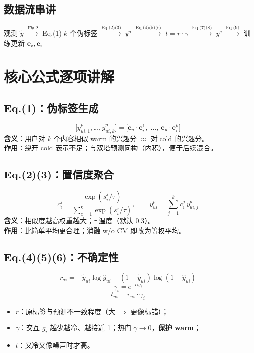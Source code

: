 \documentclass[11pt,a4paper]{ctexart}
\begin{document}
\subsection{数据流串讲}
\begin{keybox}[记忆用数据流]
观测 $\tilde{y}$
\;$\xrightarrow{\text{Fig.2}}$\;
Eq.(1) $k$ 个伪标签
\;$\xrightarrow{\text{Eq.(2)(3)}}$\;
$y^{p}$
\;$\xrightarrow{\text{Eq.(4)(5)(6)}}$\;
$t=r\cdot\gamma$
\;$\xrightarrow{\text{Eq.(7)(8)}}$\;
$y^{c}$
\;$\xrightarrow{\text{Eq.(9)}}$\;
训练更新 $\mathbf{e}_u,\mathbf{e}_i$
\end{keybox}

\section{核心公式逐项讲解}

\subsection{Eq.(1)：伪标签生成}
\[
\bigl[y^{p}_{ui,1},\ldots,y^{p}_{ui,k}\bigr]
=
\bigl[
\mathbf{e}_u\cdot\mathbf{e}_i^{1},\;\ldots,\;
\mathbf{e}_u\cdot\mathbf{e}_i^{k}
\bigr]
\tag{1}
\]
\textbf{含义}：用户对 $k$ 个内容相似 warm 的兴趣分 $\approx$ 对 cold 的兴趣分。\\
\textbf{作用}：绕开 cold 表示不足；与双塔预测同构（内积），便于后续混合。

\subsection{Eq.(2)(3)：置信度聚合}
\[
c_i^{j}
=
\frac{\exp(s_i^{j}/\tau)}{\sum_{z=1}^{k}\exp(s_i^{z}/\tau)},
\qquad
y^{p}_{ui}
=
\sum_{j=1}^{k} c_i^{j}\, y^{p}_{ui,j}
\tag{2,3}
\]
\textbf{含义}：相似度越高权重越大；$\tau$ 温度（默认 0.3）。\\
\textbf{作用}：比简单平均更合理；消融 w/o CM 即改为等权平均。

\subsection{Eq.(4)(5)(6)：不确定性}
\[
r_{ui}
=
-\tilde{y}_{ui}\log\hat{y}_{ui}
-(1-\tilde{y}_{ui})\log(1-\hat{y}_{ui})
\tag{4}
\]
\[
\gamma_i = e^{-\alpha g_i}
\tag{5}
\]
\[
t_{ui} = r_{ui}\cdot\gamma_i
\tag{6}
\]
\begin{itemize}
  \item $r$：原标签与预测不一致程度（大 $\Rightarrow$ 更像标错）；
  \item $\gamma$：交互 $g_i$ 越少越冷、越接近 1；热门 $\gamma\to 0$，\textbf{保护 warm}；
  \item $t$：又冷又像噪声时才高。
\end{itemize}
\end{document}
